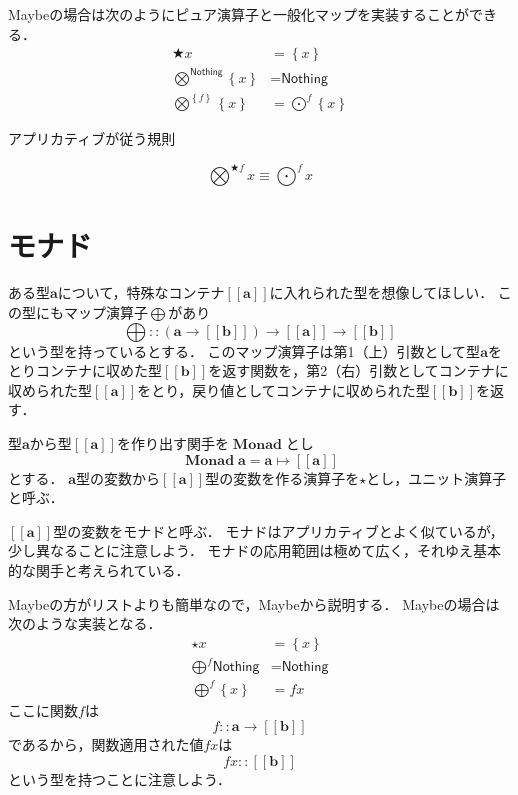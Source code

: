\documentclass[twocolumn]{jsbook}
\newcommand{\applicativefunc}{\bigotimes} %
\newcommand{\haskelllambda}{\backslash}
\newcommand{\mapfunc}{\bigodot} %
\newcommand{\monadfunc}{\bigoplus}
\newcommand{\pure}{\bigstar} %
\newcommand{\unit}{\star} %
\newcommand{\typename}[1]{\bm{#1}}
\newcommand{\maybe}[1]{\left\{#1\right\}}
\newcommand{\monad}[1]{\left[\!\left[#1\right]\!\right]}
\newcommand{\functor}[1]{\mathop{\textbf{#1}}}
\newcommand{\monadfunctor}{\mathop{\functor{Monad}}}
\newcommand{\specialkeyword}[1]{\textsf{#1}}
\newcommand{\nothing}{\specialkeyword{Nothing}}
\begin{document}
Maybeの場合は次のようにピュア演算子と一般化マップを実装することができる．
\begin{align*}
\pure x&=\maybe{x}\\
\applicativefunc^{\nothing}\maybe{x}&=\nothing\\
\applicativefunc^{\maybe{f}}\maybe{x}&=\mapfunc^f\maybe{x}
\end{align*}



アプリカティブが従う規則

$$\applicativefunc^{\pure f}x\equiv\mapfunc^fx$$

\section{モナド}

ある型$\typename{a}$について，特殊なコンテナ$\monad{\typename{a}}$に入れられた型を想像してほしい．
この型にもマップ演算子$\monadfunc$があり$$\monadfunc::\left(\typename{a}\rightarrow\monad{\typename{b}}\right)\rightarrow\monad{\typename{a}}\rightarrow{\monad{\typename{b}}}$$という型を持っているとする．
このマップ演算子は第1（上）引数として型$\typename{a}$をとりコンテナに収めた型$\monad{\typename{b}}$を返す関数を，第2（右）引数としてコンテナに収められた型$\monad{\typename{a}}$をとり，戻り値としてコンテナに収められた型$\monad{\typename{b}}$を返す．

型$\typename{a}$から型$\monad{\typename{a}}$を作り出す関手を$\monadfunctor$とし$$\monadfunctor\typename{a}=\typename{a}\mapsto\monad{\typename{a}}$$とする．
$\typename{a}$型の変数から$\monad{\typename{a}}$型の変数を作る演算子を$\unit$とし，ユニット演算子と呼ぶ．

$\monad{\typename{a}}$型の変数をモナドと呼ぶ．
モナドはアプリカティブとよく似ているが，少し異なることに注意しよう．
モナドの応用範囲は極めて広く，それゆえ基本的な関手と考えられている．

Maybeの方がリストよりも簡単なので，Maybeから説明する．
Maybeの場合は次のような実装となる．
\begin{align*}
\unit x&=\maybe{x}\\
\monadfunc^f\nothing&=\nothing\\
\monadfunc^f\maybe{x}&=fx
\end{align*}
ここに関数$f$は$$f::\typename{a}\rightarrow\monad{\typename{b}}$$であるから，関数適用された値$fx$は$$fx::\monad{\typename{b}}$$という型を持つことに注意しよう．
\end{document}
